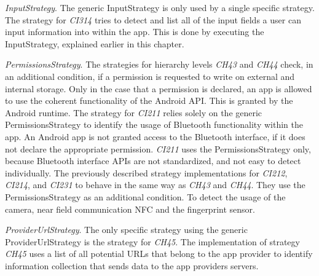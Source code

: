 \textit{InputStrategy}. The generic InputStrategy is only used by a single specific strategy.
The strategy for \textit{CI314} tries to detect and list all of the input fields a user can input information into within the app.
This is done by executing the InputStrategy, explained earlier in this chapter.

\textit{PermissionsStrategy}.
The strategies for hierarchy levels \textit{CH43} and \textit{CH44} check, in an additional condition, if a permission is requested to write on external and internal storage.
Only in the case that a permission is declared, an app is allowed to use the coherent functionality of the Android API.
This is granted by the Android runtime.
The strategy for \textit{CI211} relies solely on the generic PermissionsStrategy to identify the usage of Bluetooth functionality within the app.
An Android app is not granted access to the Bluetooth interface, if it does not declare the appropriate permission.
\textit{CI211} uses the PermissionsStrategy only, because Bluetooth interface APIs are not standardized, and not easy to detect individually.
The previously described strategy implementations for \textit{CI212}, \textit{CI214}, and \textit{CI231} to behave in the same way as \textit{CH43} and \textit{CH44}.
They use the PermissionsStrategy as an additional condition. 
To detect the usage of the camera, near field communication \acs{NFC} and the fingerprint sensor.

\textit{ProviderUrlStrategy}.
The only specific strategy using the generic ProviderUrlStrategy is the strategy for \textit{CH45}.
The implementation of strategy \textit{CH45} uses a list of all potential URLs that belong to the app provider to identify information collection that sends data to the app providers servers.

